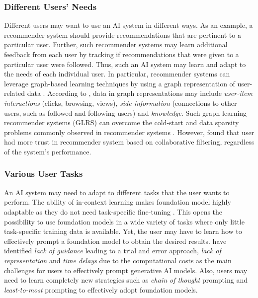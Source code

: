\subsubsection{Different Users' Needs}

Different users may want to use an AI system in different ways. As an example, a recommender system should
provide recommendations that are pertinent to a particular user. Further, such recommender systems may learn
additional feedback from each user by tracking if recommendations that were given to a particular user were
followed. Thus, such an AI system may learn and adapt to the needs of each individual user. 
In particular, recommender systems can leverage graph-based learning techniques by using a graph representation
of user-related data \citep{zhangRecommendingGraphsComprehensive2023}. According to \cite{dengRecommenderSystemsBased2022},
data in graph representations may include \textit{user-item interactions} (clicks, browsing, views), \textit{side information}
(connections to other users, such as followed and following users) and \textit{knowledge}. Such graph learning recommender
systems (GLRS) can overcome the cold-start and data sparsity problems commonly observed in recommender systems
\citep{zhangRecommendingGraphsComprehensive2023}. However, \cite{liaoUserTrustRecommendation2022} found that user had
more trust in recommender system based on collaborative filtering, regardless of the system's performance.

\subsubsection{Various User Tasks}

An AI system may need to adapt to different tasks that the user wants to perform. The ability of in-context learning makes
foundation model highly adaptable as they do not need task-specific fine-tuning \citep{brownLanguageModelsAre2020}. This opens
the possibility to use foundation models in a wide variety of tasks where only little task-specific training data is available.
Yet, the user may have to learn how to effectively prompt a foundation model to obtain the desired results. \cite{dangHowPromptOpportunities2022}
have identified \textit{lack of guidance} leading to a trial and error approach, \textit{lack of representation} and \textit{time delays}
due to the computational costs as the main challenges for users to effectively prompt generative AI models. Also, users may need to
learn completely new strategies such as \textit{chain of thought} prompting \citep{weiChainofThoughtPromptingElicits2023} and
\textit{least-to-most} prompting \citep{zhouLeasttoMostPromptingEnables2023} to effectively adopt foundation models. 

